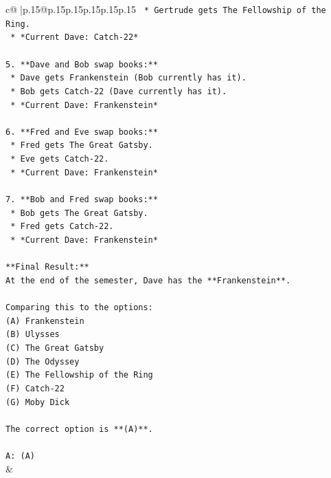 \documentclass{article}
\begin{document}
{\begin{supertabular}{c@{$\;$}|p{.15\linewidth}@{}p{.15\linewidth}p{.15\linewidth}p{.15\linewidth}p{.15\linewidth}p{.15\linewidth}}
{{{\texttt{    *   Gertrude gets The Fellowship of the Ring.} \\
\texttt{    *   *Current Dave: Catch{-}22*} \\
\\ 
\texttt{5.  **Dave and Bob swap books:**} \\
\texttt{    *   Dave gets Frankenstein (Bob currently has it).} \\
\texttt{    *   Bob gets Catch{-}22 (Dave currently has it).} \\
\texttt{    *   *Current Dave: Frankenstein*} \\
\\ 
\texttt{6.  **Fred and Eve swap books:**} \\
\texttt{    *   Fred gets The Great Gatsby.} \\
\texttt{    *   Eve gets Catch{-}22.} \\
\texttt{    *   *Current Dave: Frankenstein*} \\
\\ 
\texttt{7.  **Bob and Fred swap books:**} \\
\texttt{    *   Bob gets The Great Gatsby.} \\
\texttt{    *   Fred gets Catch{-}22.} \\
\texttt{    *   *Current Dave: Frankenstein*} \\
\\ 
\texttt{**Final Result:**} \\
\texttt{At the end of the semester, Dave has the **Frankenstein**.} \\
\\ 
\texttt{Comparing this to the options:} \\
\texttt{(A) Frankenstein} \\
\texttt{(B) Ulysses} \\
\texttt{(C) The Great Gatsby} \\
\texttt{(D) The Odyssey} \\
\texttt{(E) The Fellowship of the Ring} \\
\texttt{(F) Catch{-}22} \\
\texttt{(G) Moby Dick} \\
\\ 
\texttt{The correct option is **(A)**.} \\
\\ 
\texttt{A: (A)} \\
            }
        }
    }
    & \\ \\


\end{supertabular}}
\end{document}
